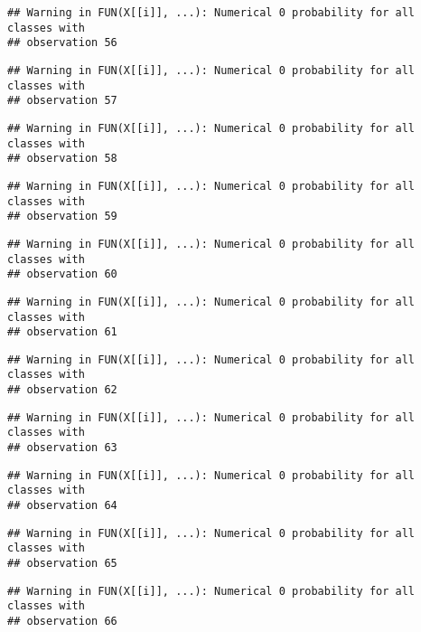 \documentclass[
]{article}
\begin{document}
\begin{verbatim}
## Warning in FUN(X[[i]], ...): Numerical 0 probability for all classes with
## observation 56
\end{verbatim}

\begin{verbatim}
## Warning in FUN(X[[i]], ...): Numerical 0 probability for all classes with
## observation 57
\end{verbatim}

\begin{verbatim}
## Warning in FUN(X[[i]], ...): Numerical 0 probability for all classes with
## observation 58
\end{verbatim}

\begin{verbatim}
## Warning in FUN(X[[i]], ...): Numerical 0 probability for all classes with
## observation 59
\end{verbatim}

\begin{verbatim}
## Warning in FUN(X[[i]], ...): Numerical 0 probability for all classes with
## observation 60
\end{verbatim}

\begin{verbatim}
## Warning in FUN(X[[i]], ...): Numerical 0 probability for all classes with
## observation 61
\end{verbatim}

\begin{verbatim}
## Warning in FUN(X[[i]], ...): Numerical 0 probability for all classes with
## observation 62
\end{verbatim}

\begin{verbatim}
## Warning in FUN(X[[i]], ...): Numerical 0 probability for all classes with
## observation 63
\end{verbatim}

\begin{verbatim}
## Warning in FUN(X[[i]], ...): Numerical 0 probability for all classes with
## observation 64
\end{verbatim}

\begin{verbatim}
## Warning in FUN(X[[i]], ...): Numerical 0 probability for all classes with
## observation 65
\end{verbatim}

\begin{verbatim}
## Warning in FUN(X[[i]], ...): Numerical 0 probability for all classes with
## observation 66
\end{verbatim}
\end{document}
